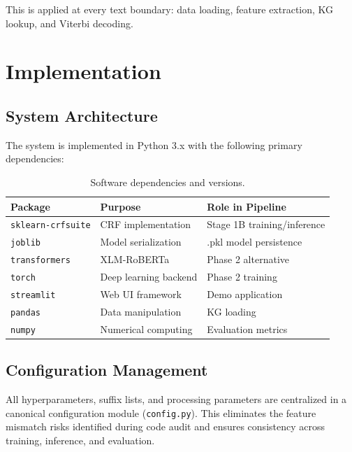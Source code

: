 \documentclass[12pt, a4paper, twoside]{report}
\begin{document}
This is applied at every text boundary: data loading, feature extraction, KG lookup, and Viterbi decoding.


\chapter{Implementation}
\label{ch:implementation}

\section{System Architecture}
\label{sec:system-arch}

The system is implemented in Python 3.x with the following primary dependencies:

\begin{table}[htbp]
\centering
\caption{Software dependencies and versions.}
\label{tab:deps}
\begin{tabular}{lll}
\toprule
\textbf{Package} & \textbf{Purpose} & \textbf{Role in Pipeline} \\
\midrule
\texttt{sklearn-crfsuite} & CRF implementation & Stage 1B training/inference \\
\texttt{joblib} & Model serialization & .pkl model persistence \\
\texttt{transformers} & XLM-RoBERTa & Phase 2 alternative \\
\texttt{torch} & Deep learning backend & Phase 2 training \\
\texttt{streamlit} & Web UI framework & Demo application \\
\texttt{pandas} & Data manipulation & KG loading \\
\texttt{numpy} & Numerical computing & Evaluation metrics \\
\bottomrule
\end{tabular}
\end{table}

\section{Configuration Management}
\label{sec:config}

All hyperparameters, suffix lists, and processing parameters are centralized in a canonical configuration module (\texttt{config.py}). This eliminates the feature mismatch risks identified during code audit and ensures consistency across training, inference, and evaluation.
\end{document}

